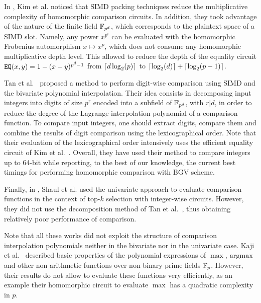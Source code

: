 In \cite{KLLW18}, Kim et al. noticed that SIMD packing techniques reduce the multiplicative complexity of homomorphic comparison circuits.
In addition, they took advantage of the nature of the finite field $\mathbb{F}_{p^d}$, which corresponds to the plaintext space of a SIMD slot.
Namely, any power $x^{p^i}$ can be evaluated with the homomorphic Frobenius automorphism $x \mapsto x^{p}$, which does not consume any homomorphic multiplicative depth level. 
This allowed to reduce the depth of the equality circuit $\mathtt{EQ}(x,y) = 1 - (x-y)^{p^{d}-1}$ from $\left\lceil d\log_2(p) \right\rceil$ to $\left\lceil \log_2(d) \right\rceil + \left\lceil \log_2(p-1) \right\rceil$.

Tan et al.~\cite{TLWRK20} proposed a method to perform digit-wise comparison using \ac{SIMD} and the bivariate polynomial interpolation.
Their idea consists in decomposing input integers into digits of size $p^r$ encoded into a subfield of $\mathbb{F}_{p^d}$, with $r | d$, in order to reduce the degree of the Lagrange interpolation polynomial of a comparison function. 
To compare input integers, one should extract digits, compare them and combine the results of digit comparison using the lexicographical order. 
Note that their evaluation of the lexicographical order intensively uses the efficient equality circuit of Kim et al.~\cite{KLLW18}. 
Overall, they have used their method to compare integers up to 64-bit while reporting, to the best of our knowledge, the current best timings for performing homomorphic comparison with BGV scheme. 

Finally, in \cite{PoPETS:SFR20}, Shaul et al. used the univariate approach to evaluate comparison functions in the context of top-$k$ selection with integer-wise circuits. 
However, they did not use the decomposition method of Tan et al.~\cite{TLWRK20}, thus obtaining relatively poor performance of comparison.

Note that all these works did not exploit the structure of comparison interpolation polynomials neither in the bivariate nor in the univariate case. 
Kaji et al.~\cite{JMC:KMNN19} described basic properties of the polynomial expressions of $\max$, $\operatorname{argmax}$ and other non-arithmetic functions over non-binary prime fields $\mathbb{F}_p$. 
However, their results do not allow to evaluate these functions very efficiently, as an example their homomorphic circuit to evaluate $\max$ has a quadratic complexity in $p$.

